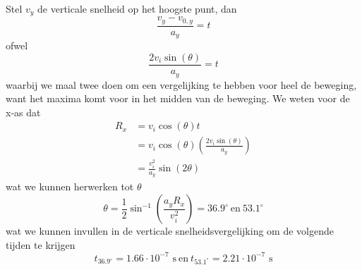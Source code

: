 \begin{description}[labelwidth=1.5cm, leftmargin=!]
        Stel $v_y$ de verticale snelheid op het hoogste punt, dan
        \begin{equation*}
            \frac{v_y-v_{0,y}}{a_y} = t
        \end{equation*}
        ofwel
        \begin{equation*}
            \frac{2v_i\sin(\theta)}{a_y} = t
        \end{equation*}
        waarbij we maal twee doen om een vergelijking te hebben voor heel de beweging, want het maxima komt voor in het midden van de beweging. We weten voor de x-as dat
        \begin{align*}
            R_x 
                &= v_i\cos(\theta)t \\
                &= v_i\cos(\theta)\left( \frac{2v_i\sin(\theta)}{a_y}\right) \\
                &=  \frac{v_i^2}{a_y} \sin(2\theta)
        \end{align*}
        wat we kunnen herwerken tot $\theta$
        \begin{equation*}
            \theta = \frac{1}{2}\sin^{-1}\left(\frac{a_yR_x}{v_i^2} \right) = 36.9^{\circ} \ \text{en} \ 53.1^{\circ} 
        \end{equation*}
        wat we kunnen invullen in de verticale snelheidsvergelijking om de volgende tijden te krijgen
        \begin{equation*}
            t_{36.9^{\circ}} = 1.66 \cdot 10^{-7} \text{ s} \ \text{en} \ t_{53.1^{\circ}} = 2.21 \cdot 10^{-7} \text{ s}
        \end{equation*}
        
    
\end{description}
